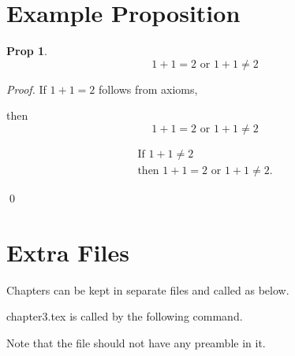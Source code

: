 \documentclass[a4paper,11pt,twoside,chapterprefix=TRUE]{scrbook}
\newtheorem{proposition}{Prop}[chapter]
\begin{document}
\section{Example Proposition}\label{propos}

\begin{proposition}
 \[ 1 + 1 = 2 \text{ or } 1+ 1 \neq 2 \]
\end{proposition}

\begin{proof}
If $1+ 1 =2 $ follows from axioms, 

then \[ 1 + 1 = 2 \text{ or } 1+ 1 \neq 2 \]

\begin{align}
\text{If } 1+ 1 \neq 2\\
\text{then } 1 + 1 = 2 \text{ or } 1+ 1 \neq 2.
\end{align}

\qed
\end{proof}

\section{Extra Files}

Chapters can be kept in separate files and called as below.

\textsf{chapter3.tex} is called by the following command. 

Note that the file should not have any preamble in it.







\backmatter



\printindex
\end{document}
